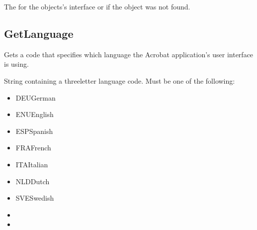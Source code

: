 \documentclass[letterpaper,12pt,english,openany,oneside]{sphinxmanual}
\begin{document}

The  for the objects’s interface or  if the object was not found.




\subsection{GetLanguage}
\label{\detokenize{IAC_API_OLE_Objects:getlanguage}}
Gets a code that specifies which language the Acrobat application’s user interface is using.


\begin{sphinxVerbatim}[commandchars=\\\{\}]
 
\end{sphinxVerbatim}


String containing a three\sphinxhyphen{}letter language code. Must be one of the following:
\begin{itemize}
\item {} 
DEU\sphinxhyphen{}German

\item {} 
ENU\sphinxhyphen{}English

\item {} 
ESP\sphinxhyphen{}Spanish

\item {} 
FRA\sphinxhyphen{}French

\item {} 
ITA\sphinxhyphen{}Italian

\item {} 
NLD\sphinxhyphen{}Dutch

\item {} 
SVE\sphinxhyphen{}Swedish

\end{itemize}
\label{\detokenize{IAC_API_OLE_Objects:related-methods-6}}
\begin{itemize}
\item {} 
 

\item {} 
 

\end{itemize}
\end{document}
